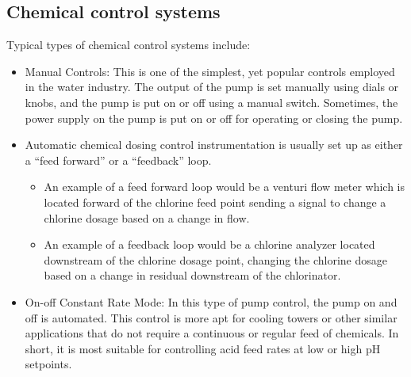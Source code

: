 \subsection {Chemical control systems}
Typical types of chemical control systems include:
\begin{itemize}
\item Manual Controls: This is one of the simplest, yet popular controls employed in the water industry. The output of the pump is set manually using dials or knobs, and the pump is put on or off using a manual switch. Sometimes, the power supply on the pump is put on or off for operating or closing the pump.
\item Automatic chemical dosing control instrumentation is usually set up as either a “feed forward” or a “feedback” loop. 
\begin{itemize}
\item An example of a feed forward loop would be a venturi flow meter which is located forward of the chlorine feed point sending a signal to change a chlorine dosage based on a change in flow. 
\item An example of a feedback loop would be a chlorine analyzer located downstream of the chlorine dosage point, changing the chlorine dosage based on a change in residual downstream of the chlorinator.
\end{itemize}
\item On-off Constant Rate Mode: In this type of pump control, the pump on and off is automated. This control is more apt for cooling towers or other similar applications that do not require a continuous or regular feed of chemicals. In short, it is most suitable for controlling acid feed rates at low or high pH setpoints.
\end{itemize}


